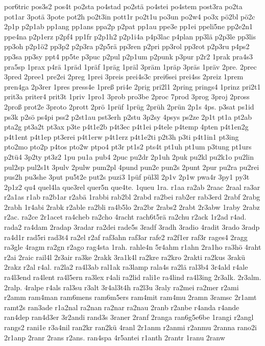 {por6tric
pos3s2
pos4t
po2sta
po4stad
po2stä
po4stei
po4stem
post3ra
po2ta
pot1ar
3potä
3pote
pot2h
po2t3in
pott1r
po2t1u
po3un
po2w4
po3x
pö2bl
pö2c
2p1p
p2p1ab
pp1ang
pp1ans
ppa2p
p2pat
pp1au
ppe3e
pp1ei
ppeli5ne
pp2e2n1
ppe4na
p2p1erz
p2pf4
pp1fr
p2p1h2
p2p1i4a
p4p3lac
p4plan
pp3lä
p2p3le
pp3lis
pp3oh
p2p1ö2
pp3p2
p2p3ra
p2p5rä
pp3ren
p2pri
pp3rol
pp3rot
p2p3ru
p4ps2
pp3sa
pp3sy
ppt4
pp5te
p3puc
p2pul
p2p1um
p2punk
p3pur
p2r2
1prak
pra4s3
pra5sp
1prax
p4rä
1präd
1präf
1präg
1präl
3präm
1präp
3präs
1präv
2pre.
2prec
3pred
2pree1
pre2ei
2preg
1prei
3preis
prei4s3c
prei6sei
prei4ss
2preiz
1prem
pren4ga
2p3rer
1pres
press4e
1preß
pri4e
2prig
pri2l1
2pring
prings4
1prinz
pri2t1
prit3a
priter4
prit3t
1priv
1pro1
3prob
pro3be
2proc
7prod
3prog
3proj
2pross
2proß
prot2e
3proto
2prott
2prö
1prüf
1prüg
2prüh
2prün
2p1s
4ps.
p3sat
ps1id
ps3k
p2sö
ps4pi
pss2
p2st1au
pst3erh
p2stu
3p2sy
4psys
ps2ze
2p1t
pt1a
pt2ab
pta2g
pt3a2t
pt3ax
p3te
p4t1e2b
p4t3ec
p4t1ei
p4tele
p4temp
4pten
p4t1en2g
p4t1ent
p4t1ep
pt3erei
p4t1erw
p4t1erz
p4t1e2ti
p2t3h
p3ti
p4t1in1
pt3ing
pto2mo
pto2p
p4tos
pto2w
ptpo4
pt3r
pt1s2
pts4t
pt1uh
pt1um
p3tung
pt1urs
p2tü4
3p2ty
pt3z2
1pu
pu1a
pub4
2puc
pu2dr
2p1uh
2puk
pu2kl
pu2k1o
pu2lin
pul2sp
pul2s1t
3pulv
2pulw
pum2pl
4pund
pun2e
pun2s
2punt
2pur
pu2ra
pu2rei
pus2h
pu3she
3put
pu5t2e
put2s
puzi3
1püf
pül3l
2p1v
2p1w
pwa4r
3py1
py3t
2p1z2
qu4
quel4la
que3rel
quer5n
que4te.
1queu
1ra.
r1aa
ra2ab
2raac
2raal
ra3ar
r2a1as
r1ab
ra2b1ar
r2abä
1rabbi
rab2bl
2rabd
ra2bei
rab2er
rab3erd
2rabf
2rabg
2rabh
1r4abi
2rabk
r2able
ra2bli
ra4b5lo
2ra2br
2rabs2
2rabt
2r3abw
1raby
2rabz
r2ac.
ra2ce
2r1acet
ra4cheb
ra2cho
4racht
rach6t5rä
ra2chu
r2ack
1r2ad
r4ad.
rada2
ra4dam
2radap
3radar
ra2dei
rade5s
3radf
3radh
3radio
4radit
3rado
3radp
ra4d1r
rad5ri
rad3t4
ra2el
r2af
raf3ahn
raf3ar
rafe2
ra2f1er
raf3r
rages4
2ragg
ra3gle
4ragm
ra2gn
r2ago
rag4sta
1rah.
rahle4n
5r4ahm
r1ahn
2ra1ho
ra3hö
4raht
r2ai
2raic
rail4l
2r3air
ra3ke
2rakk
3ra1k4l
ra2kre
ra2kro
2rakti
ra2kus
3rakü
2rakz
r2al
r4al.
ra2la2
ra4l3ab
ral1ak
ra3lamp
rala4s
ra2lä
ral3b4
3r4ald
r4ale
ra4l3end
ra4lent
ra4l5ern
ra3lex
r4ali
ra2lid
rali1e
ra4lind
ra4l3ing
2r3alk.
2r3alm.
2ralp.
4ralpe
r4als
ral3su
r3alt
3r4al3t4h
ra2l3u
3raly
ra2mei
ra2mer
r2ami
r2amm
ram4man
ram6mens
ram6m5ers
ram4mit
ram4mu
2ramn
3ramsc
2r1amt
ramt2s
ran3ade
r1a2nal
ra2nan
ra2nar
ra2nau
2ranb
r2anbe
r4anda
r4ande
ran4dep
ran4d3er
3r2andi
rand3s
3raner
2ranf
2ranga
ran6g5e6be
1rangi
r2angl
rangs2
rani1e
r3a4nil
ran2kr
ran2kü
4ranl
2r1anm
r2anmi
r2anmu
2ranna
rano2i
2r1anp
2ranr
2rans
r2ans.
ran4spa
4r5antei
r1anth
2rantr
1ranu
2ranw
}
